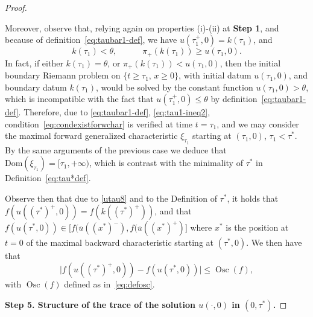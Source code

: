 \documentclass[a4paper, 10pt, final]{article}
\DeclareMathOperator{\os}{Osc}
\begin{document}
\begin{proof}
\begin{enumerate}
  Moreover, observe that, relying again on 
  properties (i)-(ii) at   {\bf Step 1}, and because of definition~\eqref{eq:taubar1-def}, we have $u({\tau}_1^+,0)=k({\tau}_1)$,
  and
  \begin{equation}
      \label{eq:tau1-ineq2}
      k({\tau}_1)
      < \theta,\qquad\quad
      \pi_+(k({\tau}_1))\geq u({\tau_1},0).
  \end{equation}
  In fact, if either $k({\tau}_1)= \theta$, or $\pi_+(k({\tau}_1))< u({\tau}_1,0)$,
  then the initial boundary Riemann problem on $\{t\geq {\tau}_1, \, x\geq 0\}$, 
  with initial datum $u({\tau}_1,0)$, and boundary datum $k({\tau}_1)$,
  would be solved by the constant function
  $u({\tau}_1,0)>\theta$, which is incompatible with the fact that 
  $u({\tau}_1^+,0)\leq \theta$
  by definition~\eqref{eq:taubar1-def}.
  Therefore, due to  \eqref{eq:taubar1-def},
  \eqref{eq:tau1-ineq2}, condition~\eqref{eq:condexistforwchar}
  is verified at time $t={\tau}_1$, and we may consider the maximal forward generalized characteristic $\xi_{{\tau}_1}$ starting at $({\tau}_1,0)$, 
  ${\tau}_1<\tau^*$.
  By  the same arguments of the previous case we deduce that
  $\text{Dom}(\xi_{{\tau}_1})=[{\tau}_1, +\infty)$,
  which is contrast with the minimality of $\tau^*$ in Definition~\eqref{eq:tau*def}.
  \end{enumerate}


  Observe then that due to \eqref{utau8} and to the Definition of $\tau^*$, it holds that 
  $f(u((\tau^*)^+,0))=f(k((\tau^*)^+))$,
  and that
  $f(u(\tau^*,0))\in \big[f(\overline{u}((x^*)^-), 
  f(\overline{u}((x^*)^+)]$ where $x^*$ is  the position at $t=0$ of the maximal backward characteristic  starting at $(\tau^*, 0)$. 
  We then have that 
  \begin{equation}
  \label{osc-est}
      \big|f(u((\tau^*)^+,0))-f(u(\tau^*,0))\big|
      \leq \os(f),
  \end{equation}
  with $\os(f)$ defined as in~\eqref{eq:defosc}. 

  \smallskip

  \noindent
  {\bf Step 5. Structure of the trace of the  solution $u(\cdot, 0)$ in $(0,\tau^*)$.} 


\end{proof}
\end{document}
